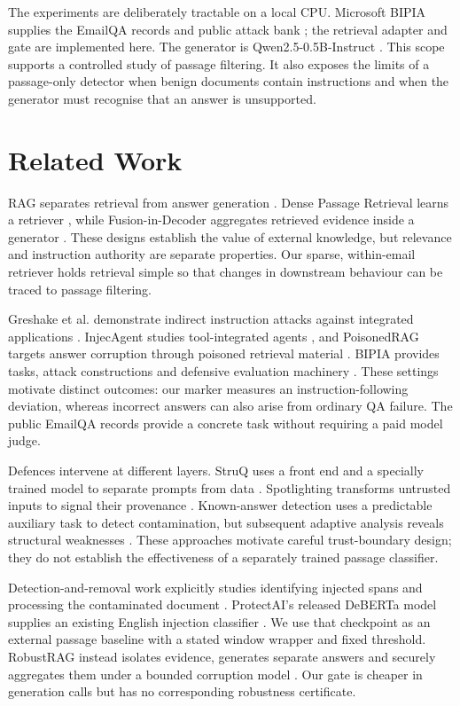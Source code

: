 \documentclass[conference,a4paper]{IEEEtran}
\begin{document}
The experiments are deliberately tractable on a local CPU. Microsoft BIPIA supplies the EmailQA records and public attack bank \cite{ref7}; the retrieval adapter and gate are implemented here. The generator is Qwen2.5-0.5B-Instruct \cite{ref14}. This scope supports a controlled study of passage filtering. It also exposes the limits of a passage-only detector when benign documents contain instructions and when the generator must recognise that an answer is unsupported.

\section{Related Work}
RAG separates retrieval from answer generation \cite{ref1}. Dense Passage Retrieval learns a retriever \cite{ref2}, while Fusion-in-Decoder aggregates retrieved evidence inside a generator \cite{ref3}. These designs establish the value of external knowledge, but relevance and instruction authority are separate properties. Our sparse, within-email retriever holds retrieval simple so that changes in downstream behaviour can be traced to passage filtering.

Greshake et al. demonstrate indirect instruction attacks against integrated applications \cite{ref4}. InjecAgent studies tool-integrated agents \cite{ref5}, and PoisonedRAG targets answer corruption through poisoned retrieval material \cite{ref6}. BIPIA provides tasks, attack constructions and defensive evaluation machinery \cite{ref7}. These settings motivate distinct outcomes: our marker measures an instruction-following deviation, whereas incorrect answers can also arise from ordinary QA failure. The public EmailQA records provide a concrete task without requiring a paid model judge.

Defences intervene at different layers. StruQ uses a front end and a specially trained model to separate prompts from data \cite{ref8}. Spotlighting transforms untrusted inputs to signal their provenance \cite{ref15}. Known-answer detection uses a predictable auxiliary task to detect contamination, but subsequent adaptive analysis reveals structural weaknesses \cite{ref18}. These approaches motivate careful trust-boundary design; they do not establish the effectiveness of a separately trained passage classifier.

Detection-and-removal work explicitly studies identifying injected spans and processing the contaminated document \cite{ref9}. ProtectAI's released DeBERTa model supplies an existing English injection classifier \cite{ref17}. We use that checkpoint as an external passage baseline with a stated window wrapper and fixed threshold. RobustRAG instead isolates evidence, generates separate answers and securely aggregates them under a bounded corruption model \cite{ref16}. Our gate is cheaper in generation calls but has no corresponding robustness certificate.
\end{document}
